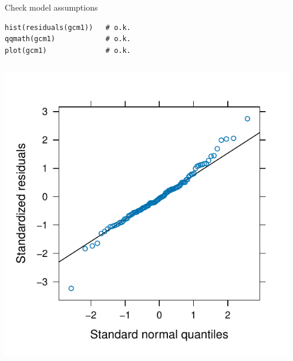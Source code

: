 \documentclass[aspectratio=169]{beamer}
\begin{document}
\begin{frame}[fragile]{Check model assumptions}
\begin{lstlisting}
hist(residuals(gcm1))   # o.k.
qqmath(gcm1)            # o.k.
plot(gcm1)              # o.k.
\end{lstlisting}
    \vspace{-.5cm}
  \begin{columns}
    \begin{column}{.5\textwidth}
      \begin{center}
      \includegraphics[scale=.55]{../figures/icon-qqplot}
      \end{center}
    \end{column}
    \begin{column}{.5\textwidth}
      \begin{center}

\end{center}
\end{column}
\end{columns}
\end{frame}
\end{document}
